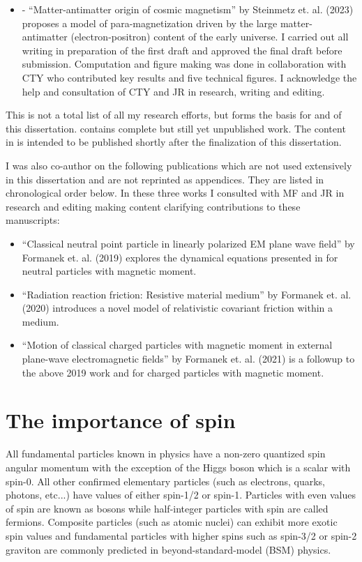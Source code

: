 \begin{itemize}
    \item {} - ``Matter-antimatter origin of cosmic magnetism'' by Steinmetz et. al. (2023) proposes a model of para-magnetization driven by the large matter-antimatter (electron-positron) content of the early universe. I carried out all writing in preparation of the first draft and approved the final draft before submission. Computation and figure making was done in collaboration with CTY who contributed key results and five technical figures. I acknowledge the help and consultation of CTY and JR in research, writing and editing.
\end{itemize}

This is not a total list of all my research efforts, but forms the basis for  and  of this dissertation.  contains complete but still yet unpublished work. The content in  is intended to be published shortly after the finalization of this dissertation.

I was also co-author on the following publications which are not used extensively in this dissertation and are not reprinted as appendices. They are listed in chronological order below. In these three works I consulted with MF and JR in research and editing making content clarifying contributions to these manuscripts:
\begin{itemize}
    \item ``Classical neutral point particle in linearly polarized EM plane wave field'' by Formanek et. al. (2019) explores the dynamical equations presented in  for neutral particles with magnetic moment.
    \item ``Radiation reaction friction: Resistive material medium'' by Formanek et. al. (2020) introduces a novel model of relativistic covariant friction within a medium.
    \item ``Motion of classical charged particles with magnetic moment in external plane-wave electromagnetic fields'' by Formanek et. al. (2021) is a followup to the above 2019 work and  for charged particles with magnetic moment.
\end{itemize}

\chapter{The importance of spin}
\label{chap:intro}
\noindent All fundamental particles known in physics have a non-zero quantized spin angular momentum with the exception of the Higgs boson which is a scalar with spin-0. All other confirmed elementary particles (such as electrons, quarks, photons, etc...) have values of either spin-1/2 or spin-1. Particles with even values of spin are known as bosons while half-integer particles with spin are called fermions. Composite particles (such as atomic nuclei) can exhibit more exotic spin values and fundamental particles with higher spins such as spin-3/2 or spin-2 graviton are commonly predicted in beyond-standard-model (BSM) physics.

